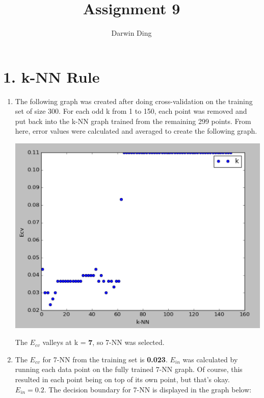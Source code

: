 \documentclass[12pt]{article}
\begin{document}
\title{Assignment 9}
\author{Darwin Ding}
\maketitle

\section*{1. k-NN Rule}
\begin{enumerate}[label=(\alph*)]
	\item The following graph was created after doing cross-validation on the training set of size 300. For each odd k from 1 to 150, each point was removed and put back into the k-NN graph trained from the remaining 299 points. From here, error values were calculated and averaged to create the following graph.
	
	\includegraphics[scale=0.6]{1a.png}
	
	The $E_{cv}$ valleys at k = \textbf{7}, so 7-NN was selected.
	\item The $E_{cv}$ for 7-NN from the training set is \textbf{0.023}. $E_{in}$ was calculated by running each data point on the fully trained 7-NN graph. Of course, this resulted in each point being on top of its own point, but that's okay. $E_{in} = \boldsymbol{0.2}$. The decision boundary for 7-NN is displayed in the graph below:
	

\end{enumerate}
\end{document}
